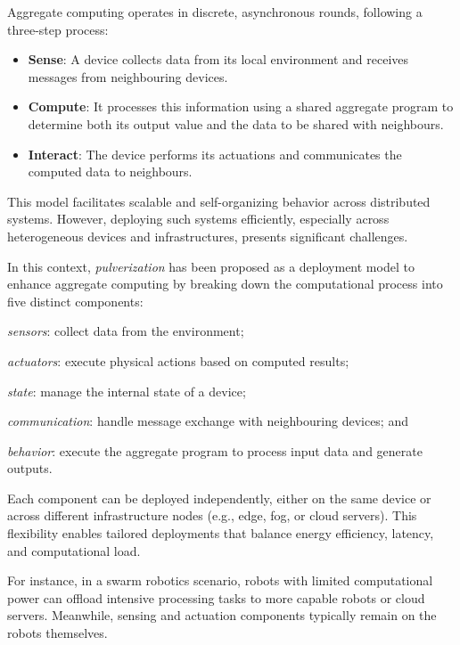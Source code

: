 \documentclass[runningheads]{llncs}
\begin{document}
Aggregate computing operates in discrete,
asynchronous rounds,
following a three-step process:

\begin{itemize}
    \item \textbf{Sense}: A device collects data from its local environment and receives messages from neighbouring devices.
    \item \textbf{Compute}: It processes this information using a shared aggregate program to determine both its output value and the data to be shared with neighbours.
    \item \textbf{Interact}: The device performs its actuations and communicates the computed data to neighbours.
\end{itemize}

This model facilitates scalable and self-organizing behavior across distributed systems.
%
However,
deploying such systems efficiently,
especially across heterogeneous devices and infrastructures,
presents significant challenges.

In this context,
\emph{pulverization} has been proposed as a deployment model to enhance aggregate computing by breaking down the computational process into five distinct components:
\begin{enumerate*}[label=(\roman*)]
    \item \emph{sensors}: collect data from the environment;
    \item \emph{actuators}: execute physical actions based on computed results;
    \item \emph{state}: manage the internal state of a device;
    \item \emph{communication}: handle message exchange with neighbouring devices; and
    \item \emph{behavior}: execute the aggregate program to process input data and generate outputs.
\end{enumerate*}

Each component can be deployed independently,
either on the same device or across different infrastructure nodes (e.g., edge, fog, or cloud servers).
%
This flexibility enables tailored deployments that balance energy efficiency,
latency,
and computational load.

For instance,
in a swarm robotics scenario,
robots with limited computational power can offload intensive processing tasks to more capable robots or cloud servers.
%
Meanwhile,
sensing and actuation components typically remain on the robots themselves.
\end{document}
